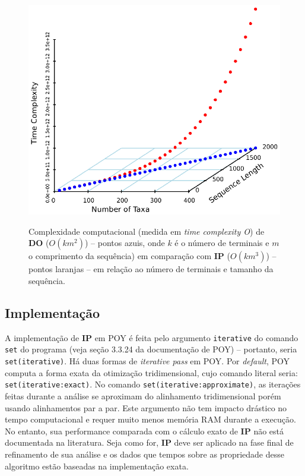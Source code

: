 \begin{refsection}
  \begin{figure}[H]
      {\includegraphics[scale=0.9]{figures/tut11/complexity.eps}}
	{\caption[Complexidade computacional de \textbf{DO} em comparação com \textbf{IP}.]{Complexidade computacional (medida em \textit{time complexity O}) de \textbf{DO} ($O(km^2)$) -- pontos azuis, onde $k$ é o número de terminais e $m$ o comprimento da sequência) em comparação com \textbf{IP} ($O(km^3)$) -- pontos laranjas -- em relação ao número de terminais e tamanho da sequência.}\label{tut11:fig:complexity}}
  \end{figure}



\subsection{Implementação}\label{tut11:ip:implementation}

A implementação de \textbf{IP} em POY é feita pelo argumento \texttt{iterative} do comando \texttt{set} do programa (veja seção 3.3.24 da documentação de POY) -- portanto, seria \texttt{set(iterative)}. Há duas formas de \textit{iterative pass} em POY. Por \textit{default}, POY computa a forma exata da otimização tridimensional, cujo comando literal seria: \texttt{set(iterative:exact)}. No comando \texttt{set(iterative:approximate)}, as iterações feitas durante a análise se aproximam do alinhamento tridimensional porém usando alinhamentos par a par. Este argumento não tem impacto drástico no tempo computacional e requer muito menos memória RAM durante a execução. No entanto, sua performance comparada com o cálculo exato de \textbf{IP} não está documentada na literatura. Seja como for, \textbf{IP} deve ser aplicado na fase final de refinamento de sua análise e os dados que tempos sobre as propriedade desse algoritmo estão baseadas na implementação exata.


\end{refsection}
